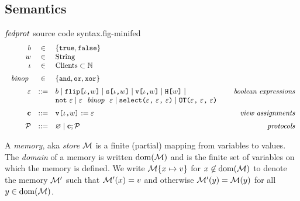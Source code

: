 \subsection{Semantics}

\begin{fpfig}[t]{$\mathit{fedprot}$ source code syntax.}{fig-minifed}
$$
\begin{array}{rcl@{\hspace{8mm}}r}
b &\in& \{ \etrue, \efalse \} \\
w &\in& \mathrm{String} \\ 
\cid &\in& \mathrm{Clients} \subset  \mathbb{N} \\[2mm]%
\bop &\in& \{ \eand, \eor, \exor \} \\[2mm]
\be &::=& b \mid \flip{\cid}{w} \mid \secret{\cid}{w} \mid \view{\cid}{w} \mid \oracle{w} \mid & \textit{boolean expressions}\\
& &  \enot\ \be \mid \be\ \bop\ \be \mid \select{\be}{\be}{\be} \mid \OT{\be}{\be}{\be} \\[2mm]
\instr &::=& \eassign{\view{\cid}{w}}{\be} & \textit{view assignments} \\[2mm]
\prog &::=& \varnothing \mid \instr; \prog & \textit{protocols}
\end{array}
$$ 
\end{fpfig}

\begin{definition}[Memories]
A \emph{memory}, aka \emph{store} $\mathcal{M}$ is a finite (partial) mapping from variables to values.
The \emph{domain} of a memory is written $\mathrm{dom}(\mathcal{M})$ and is the finite
set of variables on which the memory is defined. We write $\mathcal{M}\{ x \mapsto v\}$
for  $x\not\in\mathrm{dom}(\mathcal{M})$ to denote the memory $\mathcal{M}'$ such that $\mathcal{M}'(x) = v$ and otherwise
$\mathcal{M}'(y) = \mathcal{M}(y)$ for all $y \in \mathrm{dom}(\mathcal{M})$.
\end{definition}


